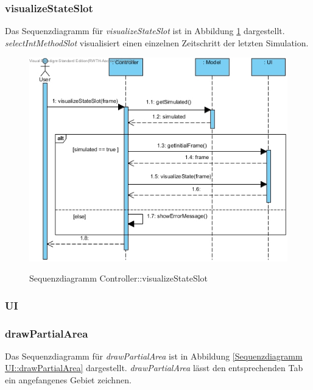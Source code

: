 \subsubsection*{visualizeStateSlot}

Das Sequenzdiagramm für \emph{visualizeStateSlot} ist in Abbildung \ref{Sequenzdiagramm Controller::visualizeStateSlot} dargestellt. \emph{selectIntMethodSlot} visualisiert einen einzelnen Zeitschritt der letzten Simulation.

\begin{figure}[H]
	\centering
	\includegraphics[scale=.75]{Bilder/Controller__visualizeStateSlot().jpg}\\
	\caption{Sequenzdiagramm Controller::visualizeStateSlot}
	\label{Sequenzdiagramm Controller::visualizeStateSlot}
\end{figure}

\subsubsection{UI}

\subsubsection*{drawPartialArea}

Das Sequenzdiagramm für \emph{drawPartialArea} ist in Abbildung \ref{Sequenzdiagramm UI::drawPartialArea} dargestellt. \emph{drawPartialArea} lässt den entsprechenden Tab ein angefangenes Gebiet zeichnen.

